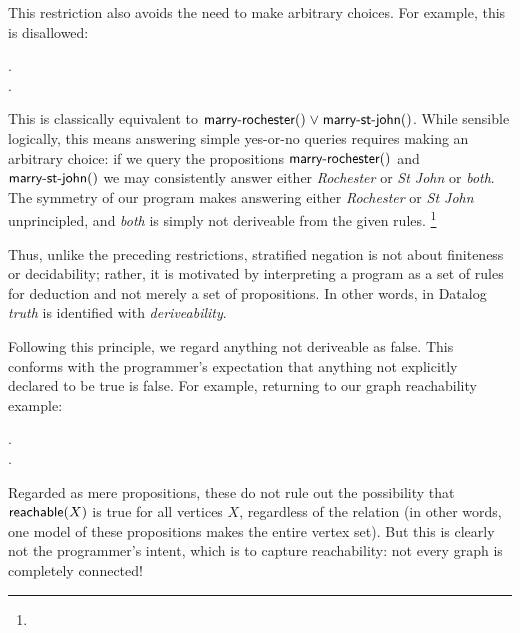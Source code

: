 This restriction also avoids the need to make arbitrary choices. For example,
this is disallowed:

\nopagebreak[1]
\begin{datalog}
   \gets \neg {}.\\
   \gets \neg {}.
\end{datalog}

\noindent
This is classically equivalent to $\atom{marry-rochester}{} \vee
\atom{marry-st-john}{}$. While sensible logically, this means answering simple
yes-or-no queries requires making an arbitrary choice: if we query the
propositions $\text{\sffamily marry-rochester}({})$ and $\text{\sffamily marry-st-john}({})$ we
may consistently answer either \emph{Rochester} or \emph{St John} or
\emph{both}.
%
The symmetry of our program makes answering either
\emph{Rochester} or \emph{St John} unprincipled, and \emph{both} is simply
not deriveable from the given rules.%
%
\footnote{}

Thus, unlike the preceding restrictions, stratified negation is not about
finiteness or decidability; rather, it is motivated by interpreting a program
as a set of rules for deduction and not merely a set of propositions. In other
words, in Datalog \emph{truth} is identified with \emph{deriveability}.

Following this principle, we regard anything not deriveable as false. This
conforms with the programmer's expectation that anything not explicitly declared
to be true is false. For example, returning to our graph reachability example:

\nopagebreak[2]
\begin{datalog}
   \gets {} \conj {}.\\
  .
\end{datalog}


\noindent
Regarded as mere propositions, these do not rule out the possibility that
$\text{\sffamily reachable}({X})$ is true for all vertices $X$, regardless of the
 relation (in other words, one model of these propositions makes
 the entire vertex set). But this is clearly not the
programmer's intent, which is to capture reachability: not every graph is
completely connected!

